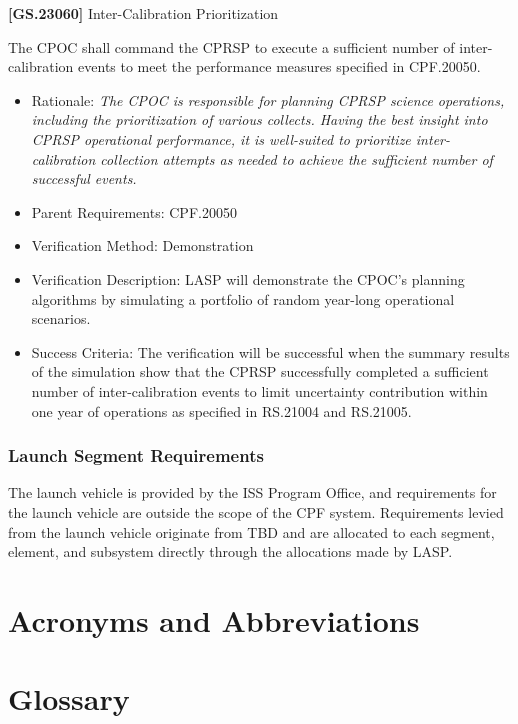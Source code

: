 \textbf{[GS.23060]} Inter-Calibration Prioritization

The \gls{CPOC} shall command the \gls{CPRSP} to execute a sufficient number of inter-calibration events to meet the performance \gls{measure}s specified in \gls{CPF}.20050.

\begin{itemize}
\item{} Rationale: \emph{The CPOC is responsible for planning CPRSP science operations, including the prioritization of various collects. Having the best insight into CPRSP operational performance, it is well-suited to prioritize inter-calibration collection attempts as needed to achieve the sufficient number of successful events.}

\item{} Parent Requirements: \gls{CPF}.20050

\item{} Verification Method: Demonstration

\item{} Verification Description: \gls{LASP} will demonstrate the \gls{CPOC}'s planning algorithms by simulating a portfolio of random year-long operational scenarios.

\item{} Success Criteria: The verification will be successful when the summary results of the simulation show that the \gls{CPRSP} successfully completed a sufficient number of inter-calibration events to limit uncertainty contribution within one year of operations as specified in \gls{RS}.21004 and \gls{RS}.21005.

\end{itemize}

\subsection{Launch Segment Requirements}
\label{launchsegmentrequirements}

The launch vehicle is provided by the \gls{ISS} Program Office, and requirements for the launch vehicle are outside the scope of the \gls{CPF} system. Requirements levied from the launch vehicle originate from TBD\label{tbx_2} and are allocated to each segment, element, and subsystem directly through the allocations made by \gls{LASP}.


\begin{appendices}


\chapter{Acronyms and Abbreviations  }
\label{sec_acros}

\printglossary[type=\acronymtype]

\chapter{Glossary  }
\label{sec_gls}


\renewcommand{\entryname}{Term}
\renewcommand{\descriptionname}{Definition}
\printglossary


\end{appendices}




